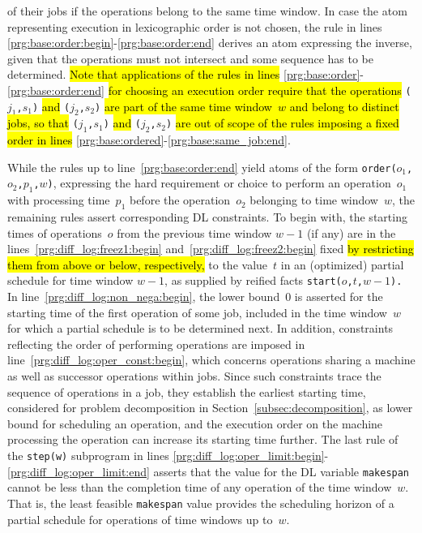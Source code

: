 \documentclass{tlp} %
\begin{document}
of their jobs if the operations belong to the same time window.
In case the atom representing execution in lexicographic order is not chosen,
the rule in lines \ref{prg:base:order:begin}-\ref{prg:base:order:end}
derives an atom expressing the inverse, given that the operations must not intersect and some sequence has to be determined.
\hl{Note that applications of the rules in lines} \ref{prg:base:order}-\ref{prg:base:order:end}
\hl{for choosing an execution order require that the
operations}
\lstinline{(}$j_1$\lstinline{,}$s_1$\lstinline{)} \hl{and}
\lstinline{(}$j_2$\lstinline{,}$s_2$\lstinline{)}
\hl{are part of the same time window~$w$ and belong to distinct jobs, so that}
\lstinline{(}$j_1$\lstinline{,}$s_1$\lstinline{)} \hl{and}
\lstinline{(}$j_2$\lstinline{,}$s_2$\lstinline{)}
\hl{are out of scope of the rules
imposing a fixed order in lines} \ref{prg:base:ordered}-\ref{prg:base:same_job:end}.%


While the rules up to line~\ref{prg:base:order:end} yield atoms of the form
\lstinline{order(}$o_1$\lstinline{,}$o_2$\lstinline{,}$p_1$\lstinline{,}$w$\lstinline{)},
expressing the hard requirement or choice to perform an operation~$o_1$
with processing time~$p_1$ before the operation~$o_2$ belonging to time window~$w$,
the remaining rules assert corresponding DL constraints. %
To begin with,
the starting times of operations~$o$ from the previous time window $w-1$ (if any)
are in the lines~\ref{prg:diff_log:freez1:begin} and~\ref{prg:diff_log:freez2:begin}
fixed \hl{by restricting them from above or below, respectively,}
to the value~$t$ in an (optimized) partial schedule for time window $w-1$, 
as supplied by reified facts \lstinline{start(}$o$\lstinline{,}$t$\lstinline{,}$w-1$\lstinline{).}
In line~\ref{prg:diff_log:non_nega:begin},
the lower bound~$0$ is asserted for the starting time of the first operation of some job,
included in the time window~$w$ for which a partial schedule is to be determined next.
In addition, constraints reflecting the order of performing operations are imposed 
in line~\ref{prg:diff_log:oper_const:begin},
which concerns operations sharing a machine as well as successor operations within jobs.
Since such constraints trace the sequence of operations in a job, they establish the
earliest starting time, considered for problem decomposition in Section~\ref{subsec:decomposition},
as lower bound for scheduling an operation, and the execution order on the machine
processing the operation can increase its starting time further.
The last rule of the \lstinline{step(w)} subprogram in lines
\ref{prg:diff_log:oper_limit:begin}-\ref{prg:diff_log:oper_limit:end} asserts
that the value for the DL variable \lstinline{makespan} cannot be less than the
completion time of any operation of the time window~$w$.
That is, the least feasible \lstinline{makespan} value provides the
scheduling horizon of a partial schedule for operations of time windows up to~$w$.
\end{document}
